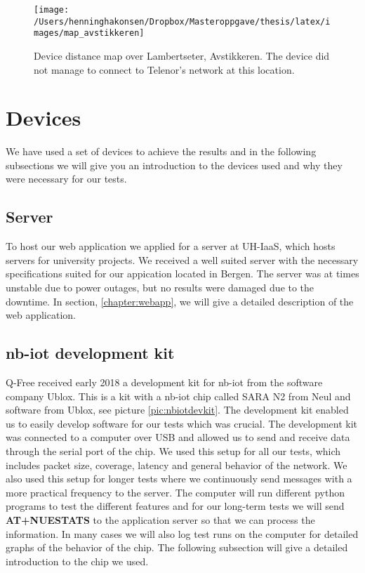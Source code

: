 \documentclass[USenglish]{ifimaster}  %
\begin{document}
\begin{figure}[H]
  \centering\texttt{[image: /Users/henninghakonsen/Dropbox/Masteroppgave/thesis/latex/images/map\_avstikkeren]}
  \caption[Distance map - Lambertseter]{Device distance map over Lambertseter, Avstikkeren. The device did not manage to connect to Telenor's network at this location.}
  \label{figure:map_avstikkeren}
\end{figure}

\section{Devices} \label{ssection:devices}
We have used a set of devices to achieve the results and in the following subsections we will give you an introduction to the devices used and why they were necessary for our tests.

\subsection{Server}
To host our web application we applied for a server at UH-IaaS, which hosts servers for university projects. We received a well suited server with the necessary specifications suited for our appication located in Bergen. The server was at times unstable due to power outages, but no results were damaged due to the downtime. In section, \vref{chapter:webapp}, we will give a detailed description of the web application.

\subsection{\acrshort{nb-iot} development kit}
Q-Free received early 2018 a development kit for \acrshort{nb-iot} from the software company Ublox. This is a kit with a \acrshort{nb-iot} chip called SARA N2 from Neul and software from Ublox, see picture \vref{pic:nbiotdevkit}. The development kit enabled us to easily develop software for our tests which was crucial. The development kit was connected to a computer over USB and allowed us to send and receive data through the serial port of the chip. We used this setup for all our tests, which includes packet size, coverage, latency and general behavior of the network. We also used this setup for longer tests where we continuously send messages with a more practical frequency to the server. The computer will run different python programs to test the different features and for our long-term tests we will send \textbf{AT+NUESTATS} to the application server so that we can process the information. In many cases we will also log test runs on the computer for detailed graphs of the behavior of the chip. The following subsection will give a detailed introduction to the chip we used.
\end{document}
